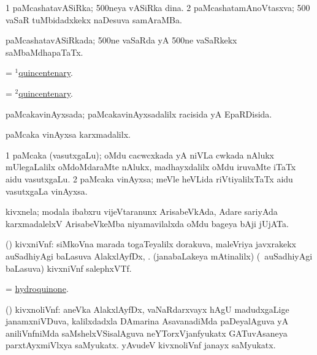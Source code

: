 \bentry
{}
\gl{\nA}
\bmng
\bnum
\num{1} paMcashatavASiRka; {\rm 500}neya vASiRka dina. 
\num{2} paMcashatamAnoVtasxva; {\rm 500} vaSaR tuMbidadxkekx naDesuva samAraMBa. 
\enum
\emng
\eentry


\bentry
{}
\gl{\gu}
\bmng
paMcashatavASiRkada; {\rm 500}ne vaSaRda yA {\rm 500}ne vaSaRkekx saMbaMdhapaTaTx. 
\emng
\eentry


\bentry
{}
\gl{\nA}
\bmng
= \hyperlink{quincentenary(1)}{$^1$quincentenary}. 
\emng
\eentry

\bentry
{}
\gl{\gu}
\expl{}
\bmng
= \hyperlink{quincentenary(2)}{$^2$quincentenary}. 
\emng
\eentry

\bentry
{}
\gl{\gu}
\expl{}
\bmng
paMcakavinAyxsada; paMcakavinAyxsadalilx racisida yA EpaRDisida. 
\emng
\eentry

\bentry
{}
\gl{\kirxvi}
\bmng
paMcaka vinAyxsa karxmadalilx. 
\emng
\eentry

\bentry
{}
\gl{\nA}
\bmng
\bnum
\num{1} paMcaka (vasutxgaLu); oMdu cacwcxkada yA niVLa cwkada nAlukx mUlegaLalilx oMdoMdaraMte nAlukx, madhayxdalilx oMdu iruvaMte iTaTx aidu vasutxgaLu. 
\num{2} paMcaka vinAyxsa; meVle heVLida riVtiyalilxTaTx aidu vasutxgaLa vinAyxsa. 
\enum
\emng
\eentry

\bentry
{}
\gl{\nA}
\bmng
kivxnela; modala ibabxru vijeVtaranunx ArisabeVkAda, Adare sariyAda karxmadalelxV ArisabeVkeMba niyamavilalxda oMdu bageya bAji jUjATa. 
\emng
\eentry

\bentry
{}
\gl{\nA}
\expl{}
\bmng
(\ravi) kivxniVnf: 
\banum
{} siMkoVna marada togaTeyalilx dorakuva, maleVriya javxrakekx auSadhiyAgi baLasuva AlakxlAyfDx, . 
 (janabaLakeya mAtinalilx) (\sA\ auSadhiyAgi baLasuva) kivxniVnf salephxVTf. 
\eanum
\emng
\eentry

\bentry
{}
\gl{\nA}
\bmng
= \hyperref{kandict_h.pdf}{H}{hydroquinone}{hydroquinone}. 
\emng
\eentry

\bentry
{}
\gl{\nA}
\bmng
(\ravi) kivxnoliVnf: 
\banum
{} aneVka AlakxlAyfDx, vaNaR\-darxvayx hAgU madudxgaLige janamxniVDuva, kalilxdadxla DAmarina AsavanadiMda paDeyalAguva yA aniliVnfniMda saMshelxVSisalAguva neYTorxVjanfyukatx GATuvAsaneya parxtAyxmiVlxya saMyukatx. 
 yAvudeV kivxnoliVnf janayx saMyukatx. 
\eanum
\emng
\eentry

